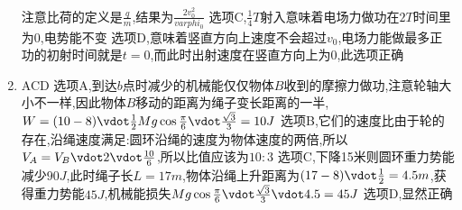 \begin{enumerate}
            注意比荷的定义是$\frac{q}{m}$,结果为$\frac{2v_{0}^{2}}{varphi_{0}}$     \newline 
            选项C,$\frac{1}{4}T$射入意味着电场力做功在$2T$时间里为0,电势能不变     \newline
            选项D,意味着竖直方向上速度不会超过$v_{0}$,电场力能做最多正功的初射时间就是$t=0$,而此时出射速度在竖直方向上为0,此选项正确 
            \item ACD   \newline
            选项A,到达$b$点时减少的机械能仅仅物体$B$收到的摩擦力做功,注意轮轴大小不一样,因此物体$B$移动的距离为绳子变长距离的一半,$ W = (10 - 8) \vdot \frac{1}{2} Mg \cos{\frac{\pi}{6}} \vdot \frac{\sqrt{3}}{3} = 10 J$     \newline 
            选项B,它们的速度比由于轮的存在,沿绳速度满足:圆环沿绳的速度为物体速度的两倍,所以$ V_{A} = V_{B} \vdot 2 \vdot \frac{10}{6}$,所以比值应该为$ 10:3 $   \newline 
            选项C,下降15米则圆环重力势能减少$90J$,此时绳子长$L = 17 m$,物体沿绳上升距离为$(17-8) \vdot \frac{1}{2} = 4.5  m$,获得重力势能$ 45J $,机械能损失$ Mg\cos{\frac{\pi}{6}} \vdot \frac{\sqrt{3}}{3} \vdot  4.5  = 45J $       \newline 
            选项D,显然正确
        \end{enumerate}

